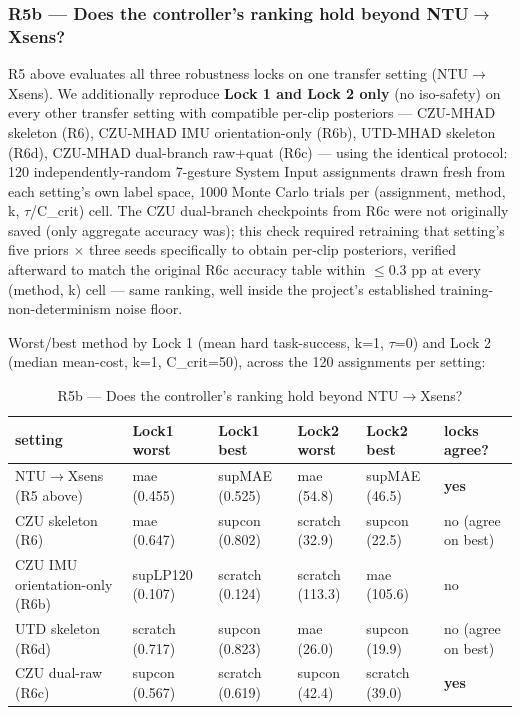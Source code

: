 \subsubsection{R5b --- Does the controller's ranking hold beyond NTU$\rightarrow$Xsens?}

R5 above evaluates all three robustness locks on one transfer setting (NTU$\rightarrow$Xsens). We additionally reproduce \textbf{Lock 1 and Lock 2 only} (no iso-safety) on every other transfer setting with compatible per-clip posteriors --- CZU-MHAD skeleton (R6), CZU-MHAD IMU orientation-only (R6b), UTD-MHAD skeleton (R6d), CZU-MHAD dual-branch raw+quat (R6c) --- using the identical protocol: 120 independently-random 7-gesture System Input assignments drawn fresh from each setting's own label space, 1000 Monte Carlo trials per (assignment, method, k, $\tau$/C\_crit) cell. The CZU dual-branch checkpoints from R6c were not originally saved (only aggregate accuracy was); this check required retraining that setting's five priors $\times$ three seeds specifically to obtain per-clip posteriors, verified afterward to match the original R6c accuracy table within $\le$0.3 pp at every (method, k) cell --- same ranking, well inside the project's established training-non-determinism noise floor.

Worst/best method by Lock 1 (mean hard task-success, k=1, $\tau$=0) and Lock 2 (median mean-cost, k=1, C\_crit=50), across the 120 assignments per setting:

\begin{table}[!t]
\centering
\caption{R5b --- Does the controller's ranking hold beyond NTU$\rightarrow$Xsens?}
\small
\begin{tabular}{llllll}
\toprule
setting & Lock1 worst & Lock1 best & Lock2 worst & Lock2 best & locks agree? \\
\midrule
NTU$\rightarrow$Xsens (R5 above) & mae (0.455) & supMAE (0.525) & mae (54.8) & supMAE (46.5) & \textbf{yes} \\
CZU skeleton (R6) & mae (0.647) & supcon (0.802) & scratch (32.9) & supcon (22.5) & no (agree on best) \\
CZU IMU orientation-only (R6b) & supLP120 (0.107) & scratch (0.124) & scratch (113.3) & mae (105.6) & no \\
UTD skeleton (R6d) & scratch (0.717) & supcon (0.823) & mae (26.0) & supcon (19.9) & no (agree on best) \\
CZU dual-raw (R6c) & supcon (0.567) & scratch (0.619) & supcon (42.4) & scratch (39.0) & \textbf{yes} \\
\bottomrule
\end{tabular}
\end{table}

